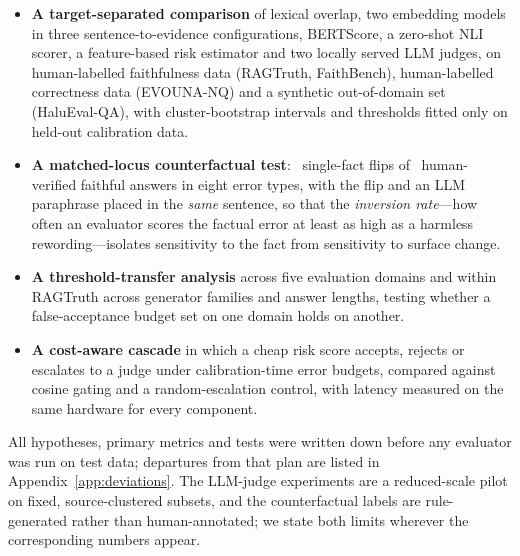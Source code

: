 \begin{itemize}\setlength{\itemsep}{1pt}
\item \textbf{A target-separated comparison} of lexical overlap, two embedding models in three sentence-to-evidence configurations, BERTScore, a zero-shot NLI scorer, a feature-based risk estimator and two locally served LLM judges, on human-labelled faithfulness data (RAGTruth, FaithBench), human-labelled correctness data (EVOUNA-NQ) and a synthetic out-of-domain set (HaluEval-QA), with cluster-bootstrap intervals and thresholds fitted only on held-out calibration data.
\item \textbf{A matched-locus counterfactual test}: \NCfPairs\ single-fact flips of \NCfBases\ human-verified faithful answers in eight error types, with the flip and an LLM paraphrase placed in the \emph{same} sentence, so that the \emph{inversion rate}---how often an evaluator scores the factual error at least as high as a harmless rewording---isolates sensitivity to the fact from sensitivity to surface change.
\item \textbf{A threshold-transfer analysis} across five evaluation domains and within RAGTruth across generator families and answer lengths, testing whether a false-acceptance budget set on one domain holds on another.
\item \textbf{A cost-aware cascade} in which a cheap risk score accepts, rejects or escalates to a judge under calibration-time error budgets, compared against cosine gating and a random-escalation control, with latency measured on the same hardware for every component.
\end{itemize}

\noindent All hypotheses, primary metrics and tests were written down before any evaluator was run on test data; departures from that plan are listed in Appendix~\ref{app:deviations}. The LLM-judge experiments are a reduced-scale pilot on fixed, source-clustered subsets, and the counterfactual labels are rule-generated rather than human-annotated; we state both limits wherever the corresponding numbers appear.

